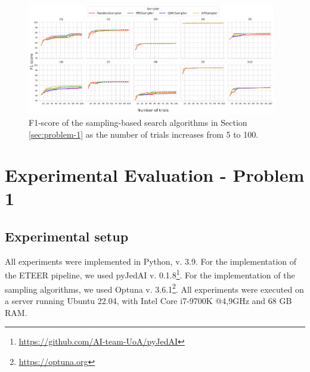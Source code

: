 \begin{figure}[h!]
    \centering
\includegraphics[width=0.97\textwidth]{figures/predictions/f1_convergence_plots.png}
    \caption{F1-score of the sampling-based search algorithms in Section \ref{sec:problem-1} as the number of trials increases from 5 to 100.}
    \label{fig:samplers-convergence-avg-f1}
\end{figure}

\section{Experimental Evaluation - Problem 1}\label{sec:experiments-p1}





\subsection{Experimental setup}
\label{sec:expSetup}
All experiments were implemented in Python, v. 3.9. For the implementation of the ETEER pipeline, we used pyJedAI v. 0.1.8\footnote{\underline{https://github.com/AI-team-UoA/pyJedAI}}. 
For the implementation of the sampling algorithms, we used Optuna v. 3.6.1\footnote{\underline{https://optuna.org}}. 
All 
experiments 
were executed on a server running 
Ubuntu 22.04, 
with Intel Core i7-9700K @4,9GHz and 68 GB RAM.

